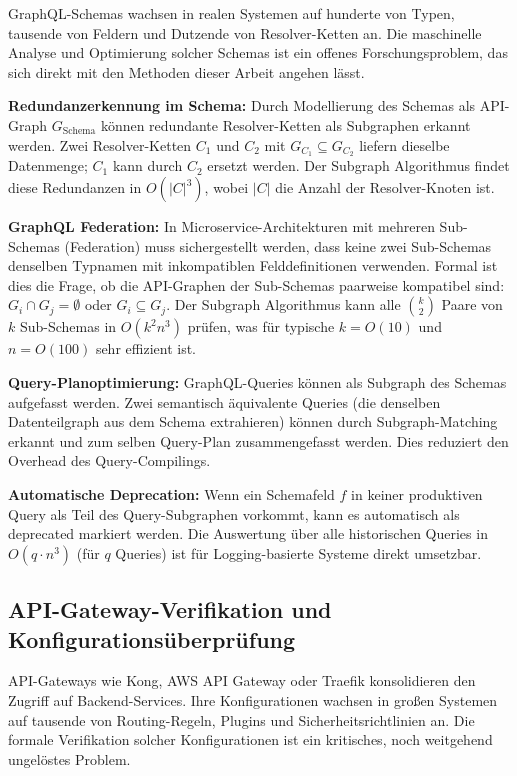 ﻿\documentclass[a4paper,12pt]{article}
\theoremstyle{definition}
\begin{document}
GraphQL-Schemas wachsen in realen Systemen auf hunderte von Typen, tausende von
Feldern und Dutzende von Resolver-Ketten an. Die maschinelle Analyse und Optimierung
solcher Schemas ist ein offenes Forschungsproblem, das sich direkt mit den Methoden
dieser Arbeit angehen lässt.

\textbf{Redundanzerkennung im Schema:} Durch Modellierung des Schemas als API-Graph
$G_{\mathrm{Schema}}$ können redundante Resolver-Ketten als Subgraphen erkannt werden.
Zwei Resolver-Ketten $C_1$ und $C_2$ mit $G_{C_1} \subseteq G_{C_2}$ liefern dieselbe
Datenmenge; $C_1$ kann durch $C_2$ ersetzt werden. Der Subgraph Algorithmus findet
diese Redundanzen in $O(|C|^3)$, wobei $|C|$ die Anzahl der Resolver-Knoten ist.

\textbf{GraphQL Federation:} In Microservice-Architekturen mit mehreren Sub-Schemas
(Federation) muss sichergestellt werden, dass keine zwei Sub-Schemas denselben
Typnamen mit inkompatiblen Felddefinitionen verwenden. Formal ist dies die Frage,
ob die API-Graphen der Sub-Schemas paarweise kompatibel sind: $G_i \cap G_j = \emptyset$
oder $G_i \subseteq G_j$. Der Subgraph Algorithmus kann alle $\binom{k}{2}$ Paare
von $k$ Sub-Schemas in $O(k^2 n^3)$ prüfen, was für typische $k = O(10)$ und
$n = O(100)$ sehr effizient ist.

\textbf{Query-Planoptimierung:} GraphQL-Queries können als Subgraph des Schemas
aufgefasst werden. Zwei semantisch äquivalente Queries (die denselben Datenteilgraph
aus dem Schema extrahieren) können durch Subgraph-Matching erkannt und zum selben
Query-Plan zusammengefasst werden. Dies reduziert den Overhead des Query-Compilings.

\textbf{Automatische Deprecation:} Wenn ein Schemafeld $f$ in keiner produktiven
Query als Teil des Query-Subgraphen vorkommt, kann es automatisch als deprecated
markiert werden. Die Auswertung über alle historischen Queries in $O(q \cdot n^3)$
(für $q$ Queries) ist für Logging-basierte Systeme direkt umsetzbar.

\subsection{API-Gateway-Verifikation und Konfigurationsüberprüfung}

API-Gateways wie Kong, AWS API Gateway oder Traefik konsolidieren den Zugriff auf
Backend-Services. Ihre Konfigurationen wachsen in großen Systemen auf tausende von
Routing-Regeln, Plugins und Sicherheitsrichtlinien an. Die formale Verifikation
solcher Konfigurationen ist ein kritisches, noch weitgehend ungelöstes Problem.
\end{document}
